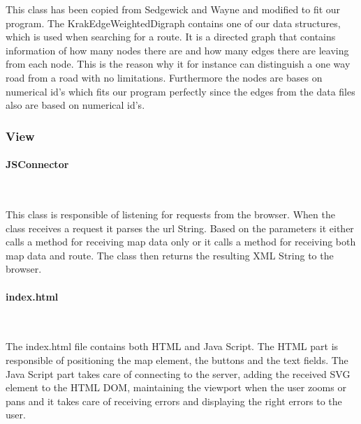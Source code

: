 \documentclass[a4paper,10pt,titlepage]{article}
\begin{document}
This class has been copied from Sedgewick and Wayne and modified to fit our program. The KrakEdgeWeightedDigraph contains one of our data structures, which is used when searching for a route. It is a directed graph that contains information of how many nodes there are and how many edges there are leaving from each node. This is the reason why it for instance can distinguish a one way road from a road with no limitations. Furthermore the nodes are bases on numerical id’s which fits our program perfectly since the edges from the data files also are based on numerical id’s. \\

				
			\subsubsection{View}
			
				\paragraph{JSConnector}\mbox{}\
				
				This class is responsible of listening for requests from the browser. When the class receives a request it parses the url String. Based on the parameters it either calls a method for receiving map data only or it calls a method for receiving both map data and route. The class then returns the resulting XML String to the browser. 


						
				\paragraph{index.html}\mbox{}\
				
				The index.html file contains both HTML and Java Script. The HTML part is responsible of positioning the map element, the buttons and the text fields. The Java Script part takes care of connecting to the server, adding the received SVG element to the HTML DOM, maintaining the viewport when the user zooms or pans and it takes care of receiving errors and displaying the right errors to the user. 
		\newpage	
\end{document}
